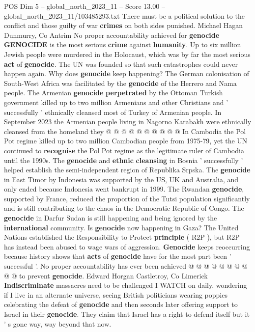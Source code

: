 \begin{textsample}{POS Dim 5 – global\_north\_2023\_11 – Score 13.00 – global\_north\_2023\_11/103485293.txt}
There must be a political solution to the conflict and those guilty of war \textbf{crimes} on both sides punished.
Michael Hagan Dunmurry, Co Antrim No proper accountability achieved for \textbf{genocide} \textbf{GENOCIDE} is the most serious \textbf{crime} against \textbf{humanity}.
Up to six million Jewish people were murdered in the Holocaust, which was by far the most serious \textbf{act} of \textbf{genocide}.
The UN was founded so that such catastrophes could never happen again.
Why does \textbf{genocide} keep happening?
The German colonisation of South-West Africa was facilitated by the \textbf{genocide} of the Herrero and Nama people.
The Armenian \textbf{genocide} \textbf{perpetrated} by the Ottoman Turkish government killed up to two million Armenians and other Christians and ' successfully ' ethnically cleansed most of Turkey of Armenian people.
In September 2023 the Armenian people living in Nagorno Karabakh were ethnically cleansed from the homeland they @ @ @ @ @ @ @ @ @ @ In Cambodia the Pol Pot regime killed up to two million Cambodian people from 1975-79, yet the UN continued to \textbf{recognise} the Pol Pot regime as the legitimate ruler of Cambodia until the 1990s.
The \textbf{genocide} and \textbf{ethnic} \textbf{cleansing} in Bosnia ' successfully ' helped establish the semi-independent region of Republika Srpska.
The \textbf{genocide} in East Timor by Indonesia was supported by the US, UK and Australia, and only ended because Indonesia went bankrupt in 1999.
The Rwandan \textbf{genocide}, supported by France, reduced the proportion of the Tutsi population significantly and is still contributing to the chaos in the Democratic Republic of Congo.
The \textbf{genocide} in Darfur Sudan is still happening and being ignored by the \textbf{international} community.
Is \textbf{genocide} now happening in Gaza?
The United Nations established the Responsibility to Protect \textbf{principle} ( R2P ), but R2P has instead been abused to wage wars of aggression. \textbf{Genocide} keeps reoccurring because history shows that \textbf{acts} of \textbf{genocide} have for the most part been ' successful '.
No proper accountability has ever been achieved @ @ @ @ @ @ @ @ @ @ to prevent \textbf{genocide}.
Edward Horgan Castletroy, Co Limerick \textbf{Indiscriminate} massacres need to be challenged I WATCH on daily, wondering if I live in an alternate universe, seeing British politicians wearing poppies celebrating the defeat of \textbf{genocide} and then seconds later offering support to Israel in their \textbf{genocide}.
They claim that Israel has a right to defend itself but it ' s gone way, way beyond that now.

\end{textsample}
